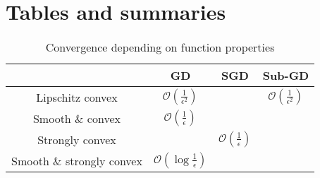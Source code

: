 \documentclass[a4paper,twoside,11pt,twocolumn]{article}
\renewcommand\O{\ensuremath{\mathcal{O}}}
\begin{document}
\newpage
\onecolumn
\appendix
\section{Tables and summaries}
\begin{table}[htpb]
	\centering
	\begin{tabular}{c|ccc}
		                           & GD                           & SGD                      & Sub-GD                     \\
		\hline
		Lipschitz convex           & $\O(\frac{1}{\epsilon^2})$   &                          & $\O(\frac{1}{\epsilon^2})$ \\
		Smooth \& convex           & $\O(\frac{1}{\epsilon})$                                                             \\
		Strongly convex            &                              & $\O(\frac{1}{\epsilon})$                              \\
		Smooth \& strongly  convex & $\O(\log\frac{1}{\epsilon})$
	\end{tabular}
	\caption{Convergence depending on function properties}
	\label{tab:convergence_speed}
\end{table}
\end{document}
